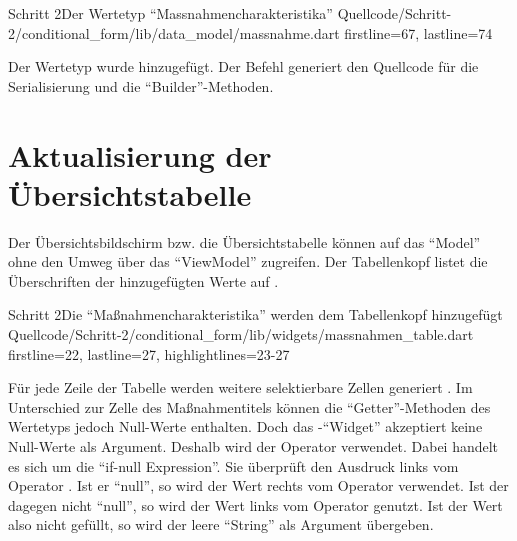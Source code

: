 \begin{alexlisting}{Schritt 2}{Der Wertetyp \enquote{Massnahmencharakteristika}}
  {Quellcode/Schritt-2/conditional_form/lib/data_model/massnahme.dart}
  {firstline=67, lastline=74}
  \label{lst:Schritt2WerteTypMassnahmencharakteristika}
\end{alexlisting}

Der Wertetyp wurde hinzugefügt.
Der Befehl  generiert den Quellcode für die Serialisierung und die \enquote{Builder}-Methoden.

\section{Aktualisierung der Übersichtstabelle}

Der Übersichtsbildschirm bzw. die Übersichtstabelle können auf das \enquote{Model} ohne den Umweg über das \enquote{ViewModel} zugreifen.
Der Tabellenkopf listet die Überschriften der hinzugefügten Werte auf .

\begin{alexlisting}{Schritt 2}{Die \enquote{Maßnahmencharakteristika} werden dem Tabellenkopf hinzugefügt}
  {Quellcode/Schritt-2/conditional_form/lib/widgets/massnahmen_table.dart}
  {firstline=22, lastline=27, highlightlines={23-27}}
  \label{lst:Schritt2MassnahmencharakteristikaEerdenDemTabellenkopfHinzugefuegt}
\end{alexlisting}

Für jede Zeile der Tabelle werden weitere selektierbare Zellen generiert .
Im Unterschied zur Zelle des Maßnahmentitels können die \enquote{Getter}-Methoden des Wertetyps  jedoch Null-Werte enthalten.
Doch das -\enquote{Widget} akzeptiert keine Null-Werte als Argument.
Deshalb wird der Operator  verwendet. Dabei handelt es sich um die \enquote{if-null Expression}. 
Sie überprüft den Ausdruck links vom Operator . Ist er \enquote{null}, so wird der Wert rechts vom Operator verwendet.
Ist der dagegen nicht \enquote{null}, so wird der Wert links vom Operator  genutzt.
 Ist der Wert also nicht gefüllt, so wird der leere \enquote{String}  als Argument übergeben.

